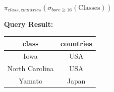 \documentclass[12pt]{article}
\begin{document}
\begin{enumerate}
\begin{enumerate}[a)]
        $\pi_{class,countries}(\sigma_{bore \geq 16}(\text{Classes}))$

        \bigskip

        \textbf{Query Result:}

        \bigskip

        \begin{tabular}{|c|c|}
            \hline
            class   &   countries\\
            \hline
            Iowa    &   USA   \\
            \hline
            North Carolina  &   USA\\
            \hline
            Yamato  &   Japan\\
            \hline
        \end{tabular}
    \end{enumerate}

\end{enumerate}
\end{document}
